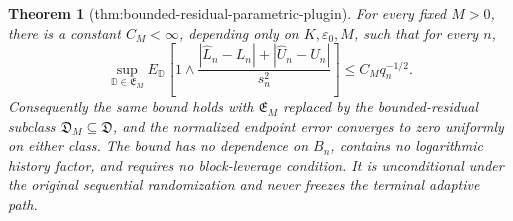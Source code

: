 \documentclass{article}
\newtheorem{theorem}{Theorem}
\begin{document}
\begin{theorem}[thm:bounded-residual-parametric-plugin]\label{thm:bounded-residual-parametric-plugin}
For every fixed \(M>0\), there is a constant \(C_M<\infty\), depending only on \(K,\varepsilon_0,M\), such that for every \(n\),
\[
\sup_{\mathbb D\in\mathfrak E_M}E_{\mathbb D}\left[1\wedge
\frac{|\widehat L_n-L_n|+|\widehat U_n-U_n|}{s_n^2}\right]
\le C_Mq_n^{-1/2}.
\]
Consequently the same bound holds with \(\mathfrak E_M\) replaced by the bounded-residual subclass \(\mathfrak D_M\subseteq\mathfrak D\), and the normalized endpoint error converges to zero uniformly on either class. The bound has no dependence on \(B_n\), contains no logarithmic history factor, and requires no block-leverage condition. It is unconditional under the original sequential randomization and never freezes the terminal adaptive path.
\end{theorem}
\end{document}
